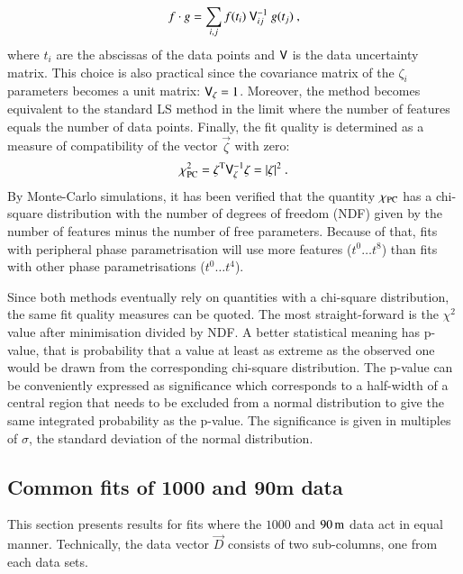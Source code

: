 \begin{equation}
\label{eq:parcmp dot product}
	f \cdot g = \sum_{i, j} f(t_i)\ \mat V^{-1}_{ij}\ g(t_j) \ ,
\end{equation}
where $t_i$ are the abscissas of the data points and $\mathsf{V}$ is the data uncertainty matrix. This choice is also practical since the covariance matrix of the $\zeta_i$ parameters becomes a unit matrix: $\mathsf{V}_{\zeta} = 1$. Moreover, the method becomes equivalent to the standard LS method in the limit where the number of features equals the number of data points. Finally, the fit quality is determined as a measure of compatibility of the vector $\vec\zeta$ with zero:
\begin{equation}
\label{eq:chi sq parcmp}
	\chi_{\rm PC}^2 = \zeta^{\rm T} \mathsf{V}_{\zeta}^{-1} \zeta = |\zeta|^2 \ .
\end{equation}
By Monte-Carlo simulations, it has been verified that the quantity $\chi_{\rm PC}$ has a chi-square distribution with the number of degrees of freedom (NDF) given by the number of features minus the number of free parameters. Because of that, fits with peripheral phase parametrisation will use more features ($t^0 \ldots t^8$) than fits with other phase parametrisations ($t^0 \ldots t^4$).


Since both methods eventually rely on quantities with a chi-square distribution, the same fit quality measures can be quoted. The most straight-forward is the $\chi^2$ value after minimisation divided by NDF. A better statistical meaning has p-value, that is probability that a value at least as extreme as the observed one would be drawn from the corresponding chi-square distribution. The p-value can be conveniently expressed as significance which corresponds to a half-width of a central region that needs to be excluded from a normal distribution to give the same integrated probability as the p-value. The significance is given in multiples of $\sigma$, the standard deviation of the normal distribution.



\subsection{Common fits of 1000 and 90m data}
\label{sec:cni common fits}

This section presents results for fits where the $1000$ and $90\,{\rm m}$ data act in equal manner. Technically, the data vector $\vec D$ consists of two sub-columns, one from each data sets.


